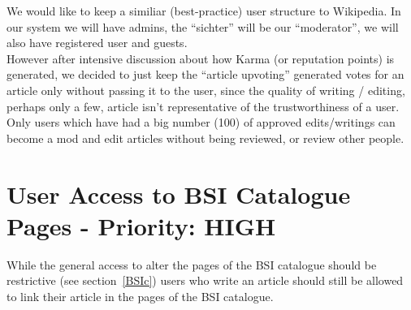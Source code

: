 \begin{tcolorbox}[breakable,colback=red!14,colframe=red!40!black,title=UPDATE 30/11/2017]
We would like to keep a similiar (best-practice) user structure to Wikipedia. In our system we will have admins, the “sichter” will be our “moderator”, we will also have registered user and guests. \\
However after intensive discussion about how Karma (or reputation points) is generated, we decided to just keep the “article upvoting” generated votes for an article only without passing it to the user, since the quality of writing / editing, perhaps only a few, article isn’t representative of the trustworthiness of a user.\\
Only users which have had a big number (100) of approved edits/writings can become a mod and edit articles without being reviewed, or review other people. 
\end{tcolorbox}


\section{User Access to BSI Catalogue Pages - Priority: HIGH}
\label{2nd_bsi_link}
While the general access to alter the pages of the BSI catalogue should be restrictive (see section~\ref{BSIc}) users who write an article should still be allowed to link their article in the pages of the BSI catalogue.

